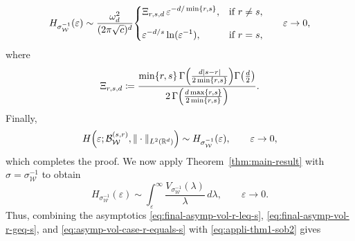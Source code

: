 \documentclass[a4paper,12pt]{article}
\let\originalleft\left
\let\originalright\right
\renewcommand{\left}{\mathopen{}\mathclose\bgroup\originalleft}
\renewcommand{\right}{\aftergroup\egroup\originalright}
\newcommand{\symbolnotsobw}{\symbolnot_{\mathcal{W}}}
\newcommand{\symbolnot}{\sigma}
\begin{document}
\[
    H_{\symbolnotsobw^{-1}}(\varepsilon)
    \sim
    \frac{\omega_d^2}{(2\pi\sqrt{c})^{d}}
    \begin{dcases}
        \Xi_{r,s,d}\,\varepsilon^{-d/\min\{r,s\}},
        & \text{if } r\neq s,\\[.25cm]
        \varepsilon^{-d/s}\ln(\varepsilon^{-1}),
        & \text{if } r=s,
    \end{dcases}
    \qquad \varepsilon\to0,
\]
where
\[
    \Xi_{r,s,d}
    \coloneqq
    \frac{
        \min\{r,s\}\,
        \Gamma \left(\frac{d|s-r|}{2\min\{r,s\}}\right)
        \Gamma \left(\frac{d}{2}\right)
    }{
        2\,
        \Gamma \left(\frac{d\max\{r,s\}}{2\min\{r,s\}}\right)
    }.
\]
Finally,
\[
H \left(\varepsilon;\mathcal{B}_{\mathcal{W}}^{(s,r)},\|\cdot\|_{L^2(\mathbb R^d)}\right)
\sim
H_{\symbolnotsobw^{-1}}(\varepsilon),
\qquad \varepsilon \to 0,
\]
which completes the proof.
\iffalse
We now apply Theorem~\ref{thm:main-result} with
$\symbolnot=\symbolnotsobw^{-1}$ to obtain
\begin{equation}\label{eq:appli-thm1-sob2}
    H_{\symbolnotsobw^{-1}}(\varepsilon)
    \sim
    \int_\varepsilon^\infty
    \frac{V_{\symbolnotsobw^{-1}}(\lambda)}{\lambda}\,d\lambda,
    \qquad \varepsilon\to0.
\end{equation}
Thus, combining the asymptotics \eqref{eq:final-asymp-vol-r-leq-s}, \eqref{eq:final-asymp-vol-r-geq-s}, and \eqref{eq:asymp-vol-case-r-equals-s} with \eqref{eq:appli-thm1-sob2} gives 
\end{document}
